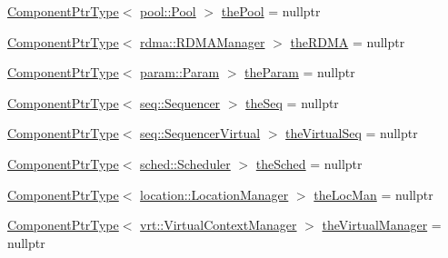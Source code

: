 \begin{DoxyCompactItemize}
\hyperlink{structvt_1_1runtime_1_1_runtime_a0893bf0a8c03b898e8ab66b52cec80ad}{Component\+Ptr\+Type}$<$ \hyperlink{structvt_1_1pool_1_1_pool}{pool\+::\+Pool} $>$ \hyperlink{structvt_1_1runtime_1_1_runtime_a060aca8399f1c6499c4676a26db2e39e}{the\+Pool} = nullptr
\item 
\hyperlink{structvt_1_1runtime_1_1_runtime_a0893bf0a8c03b898e8ab66b52cec80ad}{Component\+Ptr\+Type}$<$ \hyperlink{structvt_1_1rdma_1_1_r_d_m_a_manager}{rdma\+::\+R\+D\+M\+A\+Manager} $>$ \hyperlink{structvt_1_1runtime_1_1_runtime_ab8ec604b336a974682b0fec124a4a31b}{the\+R\+D\+MA} = nullptr
\item 
\hyperlink{structvt_1_1runtime_1_1_runtime_a0893bf0a8c03b898e8ab66b52cec80ad}{Component\+Ptr\+Type}$<$ \hyperlink{structvt_1_1param_1_1_param}{param\+::\+Param} $>$ \hyperlink{structvt_1_1runtime_1_1_runtime_a3001881d47dc04ed4e77a1e183dd970e}{the\+Param} = nullptr
\item 
\hyperlink{structvt_1_1runtime_1_1_runtime_a0893bf0a8c03b898e8ab66b52cec80ad}{Component\+Ptr\+Type}$<$ \hyperlink{structvt_1_1seq_1_1_sequencer}{seq\+::\+Sequencer} $>$ \hyperlink{structvt_1_1runtime_1_1_runtime_a02ad54cc65d06e4cf2dbc0cbfd2c9721}{the\+Seq} = nullptr
\item 
\hyperlink{structvt_1_1runtime_1_1_runtime_a0893bf0a8c03b898e8ab66b52cec80ad}{Component\+Ptr\+Type}$<$ \hyperlink{structvt_1_1seq_1_1_sequencer_virtual}{seq\+::\+Sequencer\+Virtual} $>$ \hyperlink{structvt_1_1runtime_1_1_runtime_a74ae1d2bf02482293923592df10585c0}{the\+Virtual\+Seq} = nullptr
\item 
\hyperlink{structvt_1_1runtime_1_1_runtime_a0893bf0a8c03b898e8ab66b52cec80ad}{Component\+Ptr\+Type}$<$ \hyperlink{structvt_1_1sched_1_1_scheduler}{sched\+::\+Scheduler} $>$ \hyperlink{structvt_1_1runtime_1_1_runtime_ae9d0dc11ee40a455a64982eec66e3a26}{the\+Sched} = nullptr
\item 
\hyperlink{structvt_1_1runtime_1_1_runtime_a0893bf0a8c03b898e8ab66b52cec80ad}{Component\+Ptr\+Type}$<$ \hyperlink{structvt_1_1location_1_1_location_manager}{location\+::\+Location\+Manager} $>$ \hyperlink{structvt_1_1runtime_1_1_runtime_ae198134b20e8c3787f16f4e790f95d9a}{the\+Loc\+Man} = nullptr
\item 
\hyperlink{structvt_1_1runtime_1_1_runtime_a0893bf0a8c03b898e8ab66b52cec80ad}{Component\+Ptr\+Type}$<$ \hyperlink{structvt_1_1vrt_1_1_virtual_context_manager}{vrt\+::\+Virtual\+Context\+Manager} $>$ \hyperlink{structvt_1_1runtime_1_1_runtime_a85a0606ac06cd173561952676f09c077}{the\+Virtual\+Manager} = nullptr
\item 

\end{DoxyCompactItemize}
